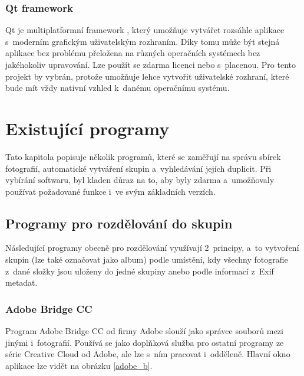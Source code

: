 \subsection*{Qt framework}

Qt je multiplatformní framework \cite{Qt}, který umožňuje vytvářet rozsáhle aplikace s~moderním grafickým uživatelským rozhraním. Díky tomu může být stejná aplikace bez problému přeložena na různých operačních systémech bez jakéhokoliv upravování. Lze použít se zdarma licenci nebo s~placenou. Pro tento projekt by vybrán, protože umožňuje lehce vytvořit uživatelské rozhraní, které bude mít vždy nativní vzhled k~danému operačnímu systému.



\chapter{Existující programy}
\label{Ex_prg}
Tato kapitola popisuje několik programů, které se zaměřují na správu sbírek fotografií, automatické vytváření skupin a~vyhledávání jejích duplicit. Při vybírání softwaru, byl kladen důraz na to, aby byly zdarma a~umožňovaly používat požadované funkce i~ve svým základních verzích. 

\section{Programy pro rozdělování do skupin}

Následující programy obecně pro rozdělování využívají 2~principy, a~to vytvoření skupin (lze také označovat jako album) podle umístění, kdy všechny fotografie z~dané složky jsou uloženy do jedné skupiny anebo podle informací z~Exif metadat.

\subsection*{Adobe Bridge CC}

Program Adobe Bridge CC od firmy Adobe \cite{AdobeBridge} slouží jako správce souborů mezi jinými i~fotografií. Používá se jako doplňková služba pro ostatní programy ze série Creative Cloud od Adobe, ale lze s~ním pracovat i~odděleně. Hlavní okno aplikace lze vidět na obrázku \ref{adobe_b}.

